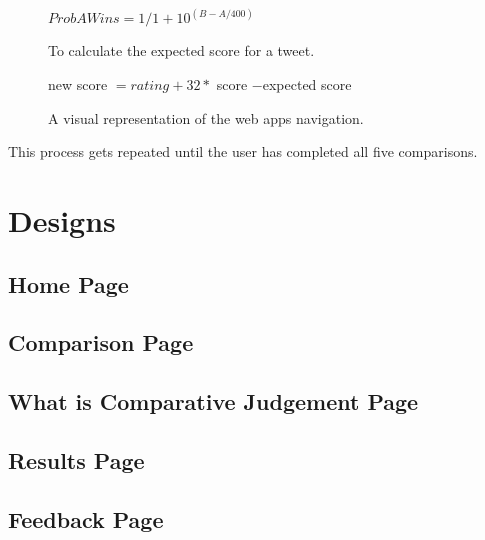 	\begin{figure}[t]
		\centering
		$ Prob A Wins = 1/1+10^{(B-A/400)}$
		\caption{To calculate the expected score for a tweet.}
		new score $= rating + 32 * $  score $ - $expected score
		\caption{A visual representation of the web apps navigation.}
		\label{fig:elo_maths}
		
	\end{figure}
	
	This process gets repeated until the user has completed all five comparisons.
	
	\section{Designs}
	
	\subsection{Home Page}
	\subsection{Comparison Page}
	\subsection{What is Comparative Judgement Page}
	\subsection{Results Page}
	\subsection{Feedback Page}
	
	